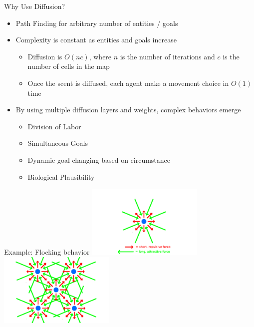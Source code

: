 \documentclass{beamer}
\begin{document}
\begin{frame}{Why Use Diffusion?}
  \begin{itemize}
  \item Path Finding for arbitrary number of entities / goals
  \item Complexity is constant as entities and goals increase
  \begin{itemize}
    \item Diffusion is $O(nc)$, where $n$ is the number of iterations and $c$ is the number of cells in the map
    \item Once the scent is diffused, each agent make a movement choice in $O(1)$ time
  \end{itemize}
  \item By using multiple diffusion layers and weights, complex behaviors emerge
    \begin{itemize}
    \item Division of Labor
    \item Simultaneous Goals
    \item Dynamic goal-changing based on circumstance
    \item Biological Plausibility
    \end{itemize}
  \end{itemize}
\end{frame}

\begin{frame}{Example: Flocking behavior}
  \includegraphics[width=2.2in]{Bird_Forces.pdf}
  \includegraphics[width=2.2in]{Bird_Forces_Multiple.pdf}
\end{frame}
\end{document}

